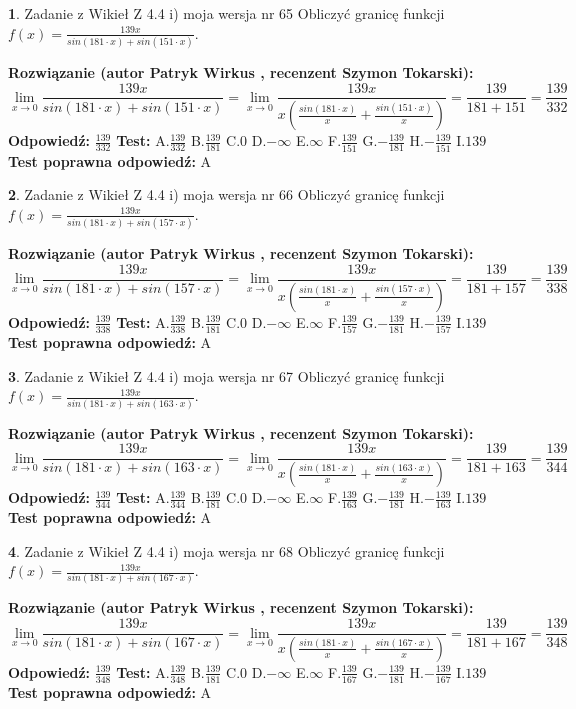 \documentclass[12pt, a4paper]{article}
\theoremstyle{definition} %
\newtheorem{zad}{}
\newcommand{\zadStart}[1]{\begin{zad}#1\newline}
\newcommand{\zadStop}{\end{zad}}
\newcommand{\rozwStart}[2]{\noindent \textbf{Rozwiązanie (autor #1 , recenzent #2): }\newline}
\newcommand{\rozwStop}{\newline}
\newcommand{\odpStart}{\noindent \textbf{Odpowiedź:}\newline}
\newcommand{\odpStop}{\newline}
\newcommand{\testStart}{\noindent \textbf{Test:}\newline}
\newcommand{\testStop}{\newline}
\newcommand{\kluczStart}{\noindent \textbf{Test poprawna odpowiedź:}\newline}
\newcommand{\kluczStop}{\newline}
\begin{document}
\zadStart{Zadanie z Wikieł Z 4.4 i) moja wersja nr 65}
Obliczyć granicę funkcji $f(x)=\frac{139x}{sin(181\cdot x) +sin(151\cdot x)}$.
\zadStop
\rozwStart{Patryk Wirkus}{Szymon Tokarski}
$$\lim\limits_{x\to 0}\frac{139x}{sin(181\cdot x) +sin(151\cdot x)}=\lim\limits_{x\to 0}\frac{139x}{x(\frac{sin(181\cdot x)}{x}+\frac{sin(151\cdot x)}{x})}=\frac{139}{181+151} = \frac{139}{332}$$
\rozwStop
\odpStart
$\frac{139}{332}$
\odpStop
\testStart
A.$\frac{139}{332}$
B.$\frac{139}{181}$
C.$0$
D.$-\infty$
E.$\infty$
F.$\frac{139}{151}$
G.$-\frac{139}{181}$
H.$-\frac{139}{151}$
I.$139$
\testStop
\kluczStart
A
\kluczStop



\zadStart{Zadanie z Wikieł Z 4.4 i) moja wersja nr 66}
Obliczyć granicę funkcji $f(x)=\frac{139x}{sin(181\cdot x) +sin(157\cdot x)}$.
\zadStop
\rozwStart{Patryk Wirkus}{Szymon Tokarski}
$$\lim\limits_{x\to 0}\frac{139x}{sin(181\cdot x) +sin(157\cdot x)}=\lim\limits_{x\to 0}\frac{139x}{x(\frac{sin(181\cdot x)}{x}+\frac{sin(157\cdot x)}{x})}=\frac{139}{181+157} = \frac{139}{338}$$
\rozwStop
\odpStart
$\frac{139}{338}$
\odpStop
\testStart
A.$\frac{139}{338}$
B.$\frac{139}{181}$
C.$0$
D.$-\infty$
E.$\infty$
F.$\frac{139}{157}$
G.$-\frac{139}{181}$
H.$-\frac{139}{157}$
I.$139$
\testStop
\kluczStart
A
\kluczStop



\zadStart{Zadanie z Wikieł Z 4.4 i) moja wersja nr 67}
Obliczyć granicę funkcji $f(x)=\frac{139x}{sin(181\cdot x) +sin(163\cdot x)}$.
\zadStop
\rozwStart{Patryk Wirkus}{Szymon Tokarski}
$$\lim\limits_{x\to 0}\frac{139x}{sin(181\cdot x) +sin(163\cdot x)}=\lim\limits_{x\to 0}\frac{139x}{x(\frac{sin(181\cdot x)}{x}+\frac{sin(163\cdot x)}{x})}=\frac{139}{181+163} = \frac{139}{344}$$
\rozwStop
\odpStart
$\frac{139}{344}$
\odpStop
\testStart
A.$\frac{139}{344}$
B.$\frac{139}{181}$
C.$0$
D.$-\infty$
E.$\infty$
F.$\frac{139}{163}$
G.$-\frac{139}{181}$
H.$-\frac{139}{163}$
I.$139$
\testStop
\kluczStart
A
\kluczStop



\zadStart{Zadanie z Wikieł Z 4.4 i) moja wersja nr 68}
Obliczyć granicę funkcji $f(x)=\frac{139x}{sin(181\cdot x) +sin(167\cdot x)}$.
\zadStop
\rozwStart{Patryk Wirkus}{Szymon Tokarski}
$$\lim\limits_{x\to 0}\frac{139x}{sin(181\cdot x) +sin(167\cdot x)}=\lim\limits_{x\to 0}\frac{139x}{x(\frac{sin(181\cdot x)}{x}+\frac{sin(167\cdot x)}{x})}=\frac{139}{181+167} = \frac{139}{348}$$
\rozwStop
\odpStart
$\frac{139}{348}$
\odpStop
\testStart
A.$\frac{139}{348}$
B.$\frac{139}{181}$
C.$0$
D.$-\infty$
E.$\infty$
F.$\frac{139}{167}$
G.$-\frac{139}{181}$
H.$-\frac{139}{167}$
I.$139$
\testStop
\kluczStart
A
\kluczStop
\end{document}
